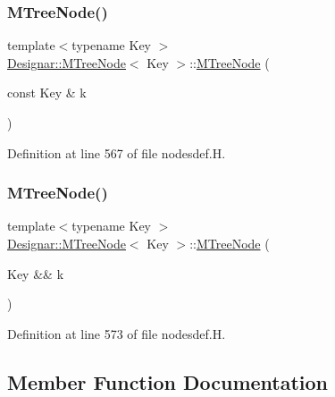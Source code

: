 \subsubsection{\texorpdfstring{M\+Tree\+Node()}{MTreeNode()}\hspace{0.1cm}{\footnotesize\ttfamily [2/3]}}
{\footnotesize\ttfamily template$<$typename Key $>$ \\
\hyperlink{class_designar_1_1_m_tree_node}{Designar\+::\+M\+Tree\+Node}$<$ Key $>$\+::\hyperlink{class_designar_1_1_m_tree_node}{M\+Tree\+Node} (\begin{DoxyParamCaption}\item[{const Key \&}]{k }\end{DoxyParamCaption})\hspace{0.3cm}{\ttfamily [inline]}}



Definition at line 567 of file nodesdef.\+H.

\mbox{\label{class_designar_1_1_m_tree_node_abee75a0ea8366fe1f815afddc4b18163}} 
\subsubsection{\texorpdfstring{M\+Tree\+Node()}{MTreeNode()}\hspace{0.1cm}{\footnotesize\ttfamily [3/3]}}
{\footnotesize\ttfamily template$<$typename Key $>$ \\
\hyperlink{class_designar_1_1_m_tree_node}{Designar\+::\+M\+Tree\+Node}$<$ Key $>$\+::\hyperlink{class_designar_1_1_m_tree_node}{M\+Tree\+Node} (\begin{DoxyParamCaption}\item[{Key \&\&}]{k }\end{DoxyParamCaption})\hspace{0.3cm}{\ttfamily [inline]}}



Definition at line 573 of file nodesdef.\+H.



\subsection{Member Function Documentation}
\mbox{\label{class_designar_1_1_m_tree_node_a393f9eb105d94c9a6cd13f09bead78aa}} 
